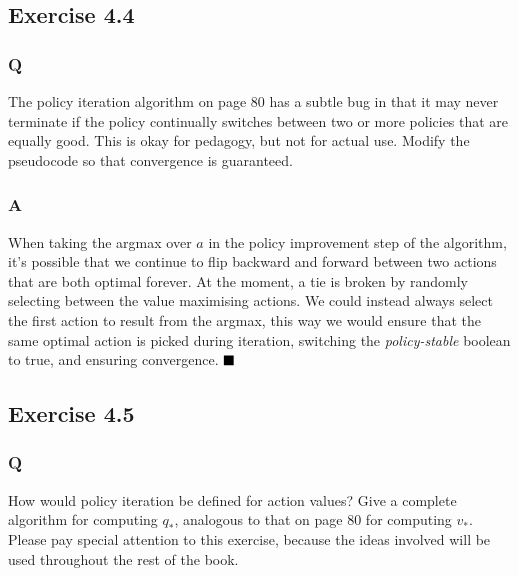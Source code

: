 \subsection{Exercise 4.4}
\subsubsection{Q}
The policy iteration algorithm on page 80 has a subtle bug in that it may never terminate if the policy continually switches between two or more policies that are equally good. This is okay for pedagogy, but not for actual use. Modify the pseudocode so that convergence is guaranteed.
\subsubsection{A}
When taking the argmax over $a$ in the policy improvement step of the algorithm, it's possible that we continue to flip backward and forward between two actions that are both optimal forever. At the moment, a tie is broken by randomly selecting between the value maximising actions. We could instead always select the first action to result from the argmax, this way we would ensure that the same optimal action is picked during iteration, switching the \textit{policy-stable} boolean to true, and ensuring convergence.
$
\hfill \blacksquare
$

\subsection{Exercise 4.5}
\subsubsection{Q}
How would policy iteration be defined for action values? Give a complete algorithm for computing $q_*$, analogous to that on page 80 for computing $v_*$. Please pay special attention to this exercise, because the ideas involved will be used throughout the rest of the book.
